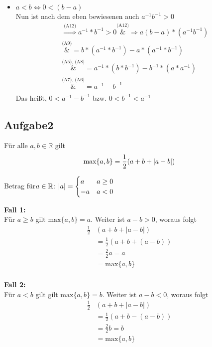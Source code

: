 \documentclass{article}
\begin{document}
\begin{enumerate}[(a)]
\begin{itemize}
  \item $a < b \iff 0 < (b - a)$ \\
    Nun ist nach dem eben bewiesenen auch $a^{-1}b^{-1} > 0$
    \begin{align*}
      \overset{\text{(A12)}}\Rightarrow a^{-1} * b^{-1} > 0 \overset{\text{(A12)}}&\Rightarrow a(b - a) * (a^{-1}b^{-1}) \\
      \overset{\text{(A9)}}&{=} b * (a^{-1} * b^{-1}) -  a * (a^{-1} * b^{-1}) \\
      \overset{\text{(A5), (A8)}}&{=} a^{-1} * (b * b^{-1}) -  b^{-1} * (a * a^{-1}) \\
      \overset{\text{(A7), (A6)}}&{=} a^{-1} - b^{-1} \\
    \end{align*}
    Das heißt, $0 < a^{-1} - b^{-1}$ bzw. $0 < b^{-1} < a^{-1}$
  \end{itemize}
\end{enumerate}
\subsection*{Aufgabe2}
Für alle $a,b \in \mathbb{R}$ gilt
\[
  \text{max}\{a,b\} = \frac{1}{2}(a + b + \abs{a - b})
\]

Betrag für$a \in \mathbb{R} \colon \abs{a} = \begin{cases}
  a & a\geq 0 \\
  -a & a < 0 \\
\end{cases}
$

\begin{minipage}{.45\textwidth}
  \textbf{Fall 1:} \\
  Für $a \geq b$ gilt $\text{max}\{a,b\} = a$. Weiter ist $a - b > 0$, woraus folgt
  \begin{align*}
    \frac{1}{2}&(a + b + |a - b|) \\
               &= \frac{1}{2}(a + b + (a - b)) \\
               &= \frac{2}{2} a = a \\
               &= \text{max}\{a,b\} \\
  \end{align*}
\end{minipage}
\hfill
\vrule
\hfill
\begin{minipage}{.45\textwidth}
  \textbf{Fall 2:} \\
  Für $a < b$ gilt gilt $\text{max}\{a,b\} = b$. Weiter ist $a - b < 0$, woraus folgt
  \begin{align*}
    \frac{1}{2}&(a + b + |a - b|) \\
               &= \frac{1}{2}(a + b - (a - b)) \\
               &= \frac{2}{2} b = b \\
               &= \text{max}\{a,b\} \\
  \end{align*}
\end{minipage}
\end{document}
